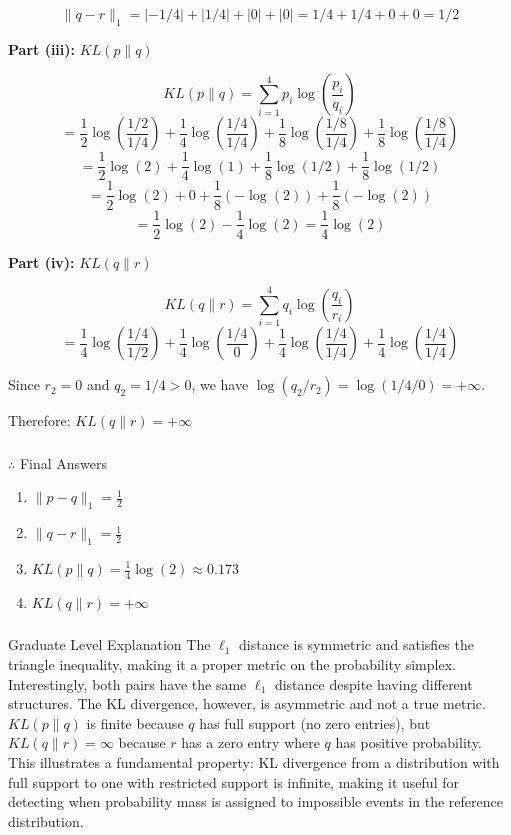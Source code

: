 \documentclass{article}
\begin{document}
{$$\|q - r\|_1 = |-1/4| + |1/4| + |0| + |0| = 1/4 + 1/4 + 0 + 0 = 1/2$$

\textbf{Part (iii):} $KL(p \| q)$

$$KL(p \| q) = \sum_{i=1}^{4} p_i \log\left(\frac{p_i}{q_i}\right)$$
$$= \frac{1}{2}\log\left(\frac{1/2}{1/4}\right) + \frac{1}{4}\log\left(\frac{1/4}{1/4}\right) + \frac{1}{8}\log\left(\frac{1/8}{1/4}\right) + \frac{1}{8}\log\left(\frac{1/8}{1/4}\right)$$
$$= \frac{1}{2}\log(2) + \frac{1}{4}\log(1) + \frac{1}{8}\log(1/2) + \frac{1}{8}\log(1/2)$$
$$= \frac{1}{2}\log(2) + 0 + \frac{1}{8}(-\log(2)) + \frac{1}{8}(-\log(2))$$
$$= \frac{1}{2}\log(2) - \frac{1}{4}\log(2) = \frac{1}{4}\log(2)$$

\textbf{Part (iv):} $KL(q \| r)$

$$KL(q \| r) = \sum_{i=1}^{4} q_i \log\left(\frac{q_i}{r_i}\right)$$
$$= \frac{1}{4}\log\left(\frac{1/4}{1/2}\right) + \frac{1}{4}\log\left(\frac{1/4}{0}\right) + \frac{1}{4}\log\left(\frac{1/4}{1/4}\right) + \frac{1}{4}\log\left(\frac{1/4}{1/4}\right)$$

Since $r_2 = 0$ and $q_2 = 1/4 > 0$, we have $\log(q_2/r_2) = \log(1/4/0) = +\infty$.

Therefore: $KL(q \| r) = +\infty$
}

\subsubsection*{\normalfont}{$\therefore$ Final Answers}
\begin{enumerate}
\item $\|p - q\|_1 = \frac{1}{2}$
\item $\|q - r\|_1 = \frac{1}{2}$
\item $KL(p \| q) = \frac{1}{4}\log(2) \approx 0.173$
\item $KL(q \| r) = +\infty$
\end{enumerate}

\subsubsection*{\normalfont}{Graduate Level Explanation}
The $\ell_1$ distance is symmetric and satisfies the triangle inequality, making it a proper metric on the probability simplex. Interestingly, both pairs have the same $\ell_1$ distance despite having different structures. The KL divergence, however, is asymmetric and not a true metric. $KL(p \| q)$ is finite because $q$ has full support (no zero entries), but $KL(q \| r) = \infty$ because $r$ has a zero entry where $q$ has positive probability. This illustrates a fundamental property: KL divergence from a distribution with full support to one with restricted support is infinite, making it useful for detecting when probability mass is assigned to impossible events in the reference distribution.
\end{document}
